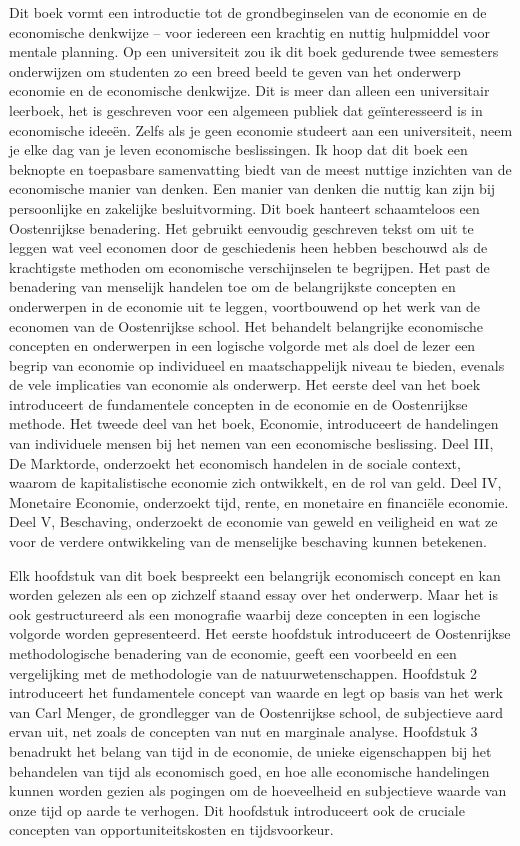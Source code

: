 Dit boek vormt een introductie tot de grondbeginselen van de economie en de economische denkwijze – voor iedereen een krachtig en nuttig hulpmiddel voor mentale planning. Op een universiteit zou ik dit boek gedurende twee semesters onderwijzen om studenten zo een breed beeld te geven van het onderwerp economie en de economische denkwijze. Dit is meer dan alleen een universitair leerboek, het is geschreven voor een algemeen publiek dat geïnteresseerd is in economische ideeën. Zelfs als je geen economie studeert aan een universiteit, neem je elke dag van je leven economische beslissingen. Ik hoop dat dit boek een beknopte en toepasbare samenvatting biedt van de meest nuttige inzichten van de economische manier van denken. Een manier van denken die nuttig kan zijn bij persoonlijke en zakelijke besluitvorming.
Dit boek hanteert schaamteloos een Oostenrijkse benadering. Het gebruikt eenvoudig geschreven tekst om uit te leggen wat veel economen door de geschiedenis heen hebben beschouwd als de krachtigste methoden om economische verschijnselen te begrijpen. Het past de benadering van menselijk handelen toe om de belangrijkste concepten en onderwerpen in de economie uit te leggen, voortbouwend op het werk van de economen van de Oostenrijkse school. Het behandelt belangrijke economische concepten en onderwerpen in een logische volgorde met als doel de lezer een begrip van economie op individueel en maatschappelijk niveau te bieden, evenals de vele implicaties van economie als onderwerp. Het eerste deel van het boek introduceert de fundamentele concepten in de economie en de Oostenrijkse methode. Het tweede deel van het boek, Economie, introduceert de handelingen van individuele mensen bij het nemen van een economische beslissing. Deel III, De Marktorde, onderzoekt het economisch handelen in de sociale context, waarom de kapitalistische economie zich ontwikkelt, en de rol van geld. Deel IV, Monetaire Economie, onderzoekt tijd, rente, en monetaire en financiële economie. Deel V, Beschaving, onderzoekt de economie van geweld en veiligheid en wat ze voor de verdere ontwikkeling van de menselijke beschaving kunnen betekenen.

Elk hoofdstuk van dit boek bespreekt een belangrijk economisch concept en kan worden gelezen als een op zichzelf staand essay over het onderwerp. Maar het is ook gestructureerd als een monografie waarbij deze concepten in een logische volgorde worden gepresenteerd. Het eerste hoofdstuk introduceert de Oostenrijkse methodologische benadering van de economie, geeft een voorbeeld en een vergelijking met de methodologie van de natuurwetenschappen. Hoofdstuk 2 introduceert het fundamentele concept van waarde en legt op basis van het werk van Carl Menger, de grondlegger van de Oostenrijkse school, de subjectieve aard ervan uit, net zoals de concepten van nut en marginale analyse. Hoofdstuk 3 benadrukt het belang van tijd in de economie, de unieke eigenschappen bij het behandelen van tijd als economisch goed, en hoe alle economische handelingen kunnen worden gezien als pogingen om de hoeveelheid en subjectieve waarde van onze tijd op aarde te verhogen. Dit hoofdstuk introduceert ook de cruciale concepten van opportuniteitskosten en tijdsvoorkeur.

